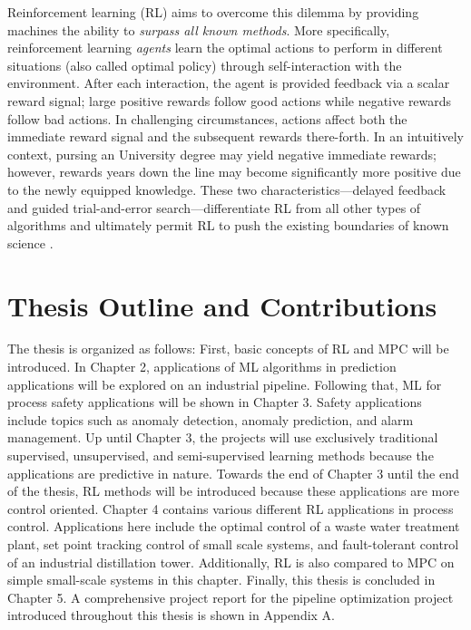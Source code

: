 Reinforcement learning (RL) aims to overcome this dilemma by providing machines the ability to \textit{surpass all known methods}.  More specifically, reinforcement learning \textit{agents} learn the optimal actions to perform in different situations (also called optimal policy) through self-interaction with the environment.  After each interaction, the agent is provided feedback via a scalar reward signal; large positive rewards follow good actions while negative rewards follow bad actions.  In challenging circumstances, actions affect both the immediate reward signal and the subsequent rewards there-forth. In an intuitively context, pursing an University degree may yield negative immediate rewards; however, rewards years down the line may become significantly more positive due to the newly equipped knowledge.  These two characteristics---delayed feedback and guided trial-and-error search---differentiate RL from all other types of algorithms and ultimately permit RL to push the existing boundaries of known science \cite{sutton}.

\section{Thesis Outline and Contributions}
The thesis is organized as follows: First, basic concepts of RL and MPC will be introduced.  In Chapter 2, applications of ML algorithms in prediction applications will be explored on an industrial pipeline.  Following that, ML for process safety applications will be shown in Chapter 3. Safety applications include topics such as anomaly detection, anomaly prediction, and alarm management. Up until Chapter 3, the projects will use exclusively traditional supervised, unsupervised, and semi-supervised learning methods because the applications are predictive in nature.  Towards the end of Chapter 3 until the end of the thesis, RL methods will be introduced because these applications are more control oriented. Chapter 4 contains various different RL applications in process control. Applications here include the optimal control of a waste water treatment plant, set point tracking control of small scale systems, and fault-tolerant control of an industrial distillation tower. Additionally, RL is also compared to MPC on simple small-scale systems in this chapter. Finally, this thesis is concluded in Chapter 5.  A comprehensive project report for the pipeline optimization project introduced throughout this thesis is shown in Appendix A.

